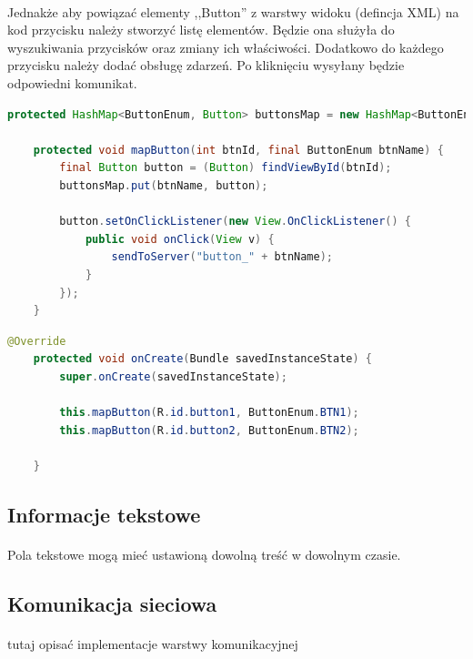 \paragraph{}
Jednakże aby powiązać elementy ,,Button'' z warstwy widoku (defincja XML) na kod przycisku  należy stworzyć listę elementów. Będzie ona służyła do wyszukiwania przycisków oraz zmiany ich właściwości. Dodatkowo do każdego przycisku należy dodać obsługę zdarzeń. Po kliknięciu wysyłany będzie odpowiedni komunikat.

\begin{lstlisting}[language=Java]
    protected HashMap<ButtonEnum, Button> buttonsMap = new HashMap<ButtonEnum, Button>();

    protected void mapButton(int btnId, final ButtonEnum btnName) {
        final Button button = (Button) findViewById(btnId);
        buttonsMap.put(btnName, button);

        button.setOnClickListener(new View.OnClickListener() {
            public void onClick(View v) {
                sendToServer("button_" + btnName);
            }
        });
    }
\end{lstlisting}


\begin{lstlisting}[language=Java]
 @Override
    protected void onCreate(Bundle savedInstanceState) {
        super.onCreate(savedInstanceState);

        this.mapButton(R.id.button1, ButtonEnum.BTN1);
        this.mapButton(R.id.button2, ButtonEnum.BTN2);

    }
\end{lstlisting}

\subsection{Informacje tekstowe}
\paragraph{}
Pola tekstowe mogą mieć ustawioną dowolną treść w dowolnym czasie.

\subsection{Komunikacja sieciowa}
\paragraph{}
{\color{red}tutaj opisać implementacje warstwy komunikacyjnej}

